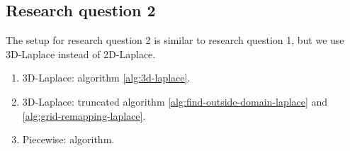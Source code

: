%


%

\subsection{Research question 2}
The setup for research question 2 is similar to research question 1, but we use 3D-Laplace instead of 2D-Laplace.
\begin{enumerate}
  \item 3D-Laplace: algorithm \ref{alg:3d-laplace}.
  \item 3D-Laplace: truncated algorithm \ref{alg:find-outside-domain-laplace} and \ref{alg:grid-remapping-laplace}.
  \item Piecewise: algorithm.
\end{enumerate}
\newpage
